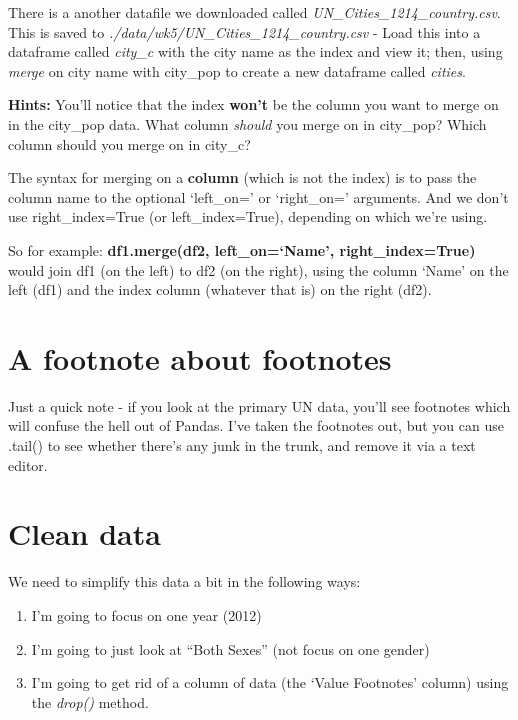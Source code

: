 \documentclass[
  letterpaper,
  DIV=11,
  numbers=noendperiod]{scrreprt}
\providecommand{\tightlist}{%
  \setlength{\itemsep}{0pt}\setlength{\parskip}{0pt}}\usepackage{longtable,booktabs,array}
\begin{document}
There is a another datafile we downloaded called
\emph{UN\_Cities\_1214\_country.csv}. This is saved to
\emph{./data/wk5/UN\_Cities\_1214\_country.csv} - Load this into a
dataframe called \emph{city\_c} with the city name as the index and view
it; then, using \emph{merge} on city name with city\_pop to create a new
dataframe called \emph{cities}.

\textbf{Hints:} You'll notice that the index \textbf{won't} be the
column you want to merge on in the city\_pop data. What column
\emph{should} you merge on in city\_pop? Which column should you merge
on in city\_c?

The syntax for merging on a \textbf{column} (which is not the index) is
to pass the column name to the optional `left\_on=' or `right\_on='
arguments. And we don't use right\_index=True (or left\_index=True),
depending on which we're using.

So for example: \textbf{df1.merge(df2, left\_on=`Name',
right\_index=True)} would join df1 (on the left) to df2 (on the right),
using the column `Name' on the left (df1) and the index column (whatever
that is) on the right (df2).

\hypertarget{a-footnote-about-footnotes}{%
\section{A footnote about footnotes}\label{a-footnote-about-footnotes}}

Just a quick note - if you look at the primary UN data, you'll see
footnotes which will confuse the hell out of Pandas. I've taken the
footnotes out, but you can use .tail() to see whether there's any junk
in the trunk, and remove it via a text editor.

\hypertarget{clean-data}{%
\section{Clean data}\label{clean-data}}

We need to simplify this data a bit in the following ways:

\begin{enumerate}
\def\labelenumi{\arabic{enumi}.}
\tightlist
\item
  I'm going to focus on one year (2012)
\item
  I'm going to just look at ``Both Sexes'' (not focus on one gender)
\item
  I'm going to get rid of a column of data (the `Value Footnotes'
  column) using the \emph{drop()} method.
\end{enumerate}
\end{document}
